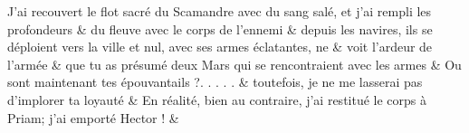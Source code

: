 \documentclass[12pt,onecolumn,twoside,a4paper]{memoir}
\begin{document}
\begin{pairs}
\begin{Rightside}
                         \stanza  J’ai recouvert le flot sacré du Scamandre avec du sang salé, et j’ai
                              rempli les profondeurs & 
                      du fleuve avec le corps de l’ennemi  \&
                         \stanza  depuis les navires, ils se déploient vers la ville et nul, avec ses
                              armes éclatantes, ne & 
                      voit l’ardeur de l’armée \&
                         \stanza 
                      que tu as présumé deux Mars qui se rencontraient avec les armes \&
                         \stanza 
                      Ou sont maintenant tes épouvantails ?. . . . . \&
                         \stanza 
                      toutefois, je ne me lasserai pas d’implorer ta loyauté \&
                         \stanza 
                      En réalité, bien au contraire, j’ai restitué le corps à Priam; j’ai
                              emporté Hector ! \&
                     
                  \endnumbering
		\end{Rightside}
               \end{pairs}
	\Columns
            
            
\end{document}
